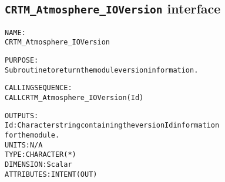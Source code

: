 \subsection{\texttt{CRTM\_Atmosphere\_IOVersion} interface}
  \label{sec:CRTM_Atmosphere_IOVersion_interface}
  \begin{alltt}
 
  NAME:
        CRTM_Atmosphere_IOVersion
 
  PURPOSE:
        Subroutine to return the module version information.
 
  CALLING SEQUENCE:
        CALL CRTM_Atmosphere_IOVersion( Id )
 
  OUTPUTS:
        Id:            Character string containing the version Id information
                       for the module.
                       UNITS:      N/A
                       TYPE:       CHARACTER(*)
                       DIMENSION:  Scalar
                       ATTRIBUTES: INTENT(OUT)
 
  \end{alltt}
